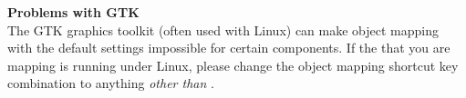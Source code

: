 \textbf{Problems with GTK}\\
The GTK graphics toolkit (often used with Linux) can make object mapping with the default settings impossible for certain components. If the \gdaut{} that you are mapping is running under Linux, please change the object mapping shortcut key combination to anything \emph{other than} .
